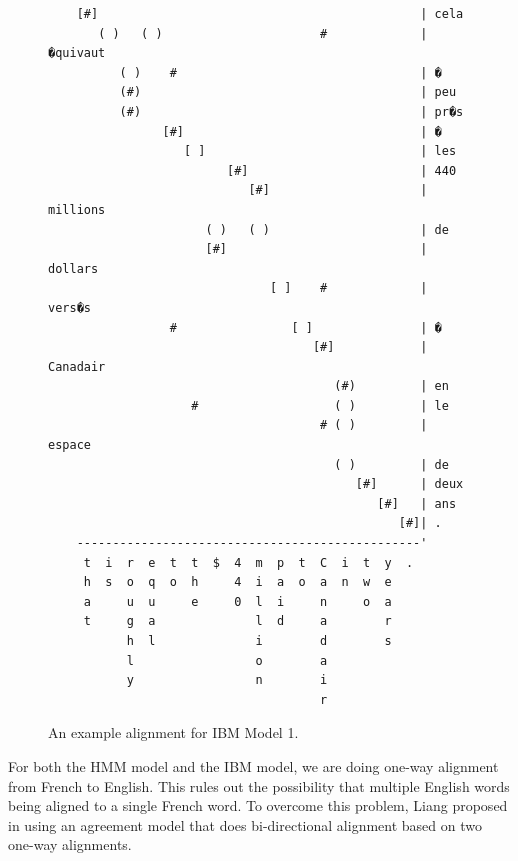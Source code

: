 \documentclass[12pt]{article}   %
\begin{document}
\begin{figure}[h]
\centering
{\tiny
\begin{verbatim}
	[#]                                             | cela
	   ( )   ( )                      #             | �quivaut
	      ( )    #                                  | �
	      (#)                                       | peu
	      (#)                                       | pr�s
	            [#]                                 | �
	               [ ]                              | les
	                     [#]                        | 440
	                        [#]                     | millions
	                  ( )   ( )                     | de
	                  [#]                           | dollars
	                           [ ]    #             | vers�s
	             #                [ ]               | �
	                                 [#]            | Canadair
	                                    (#)         | en
	                #                   ( )         | le
	                                  # ( )         | espace
	                                    ( )         | de
	                                       [#]      | deux
	                                          [#]   | ans
	                                             [#]| .
	------------------------------------------------'
	 t  i  r  e  t  t  $  4  m  p  t  C  i  t  y  . 
	 h  s  o  q  o  h     4  i  a  o  a  n  w  e    
	 a     u  u     e     0  l  i     n     o  a    
	 t     g  a              l  d     a        r    
	       h  l              i        d        s    
	       l                 o        a             
	       y                 n        i             
	                                  r
\end{verbatim}
}
\label{fig:model1align}
\caption{An example alignment for IBM Model 1.}
\end{figure}

For both the HMM model and the IBM model, we are doing one-way alignment from French to English. This rules out the possibility that multiple English words being aligned to a single French word. To overcome this problem, Liang proposed in \cite{align-agreement} using an agreement model that does bi-directional alignment based on two one-way alignments. 
\end{document}
